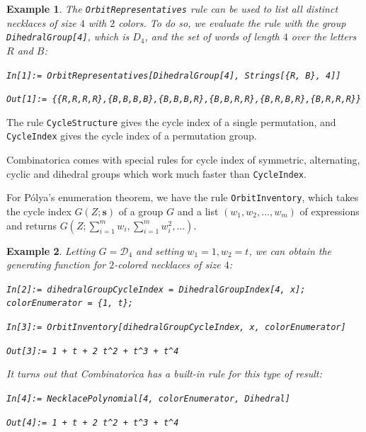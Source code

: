 \documentclass[12pt]{article}
\theoremstyle{plain}
\newtheorem{exa}{Example}
\newcommand{\codefont}[1]{{\fontshape{n}\texttt{#1}}}
\newenvironment{snippet}{\vspace{10px}\fontfamily{ppl}\selectfont}{\vspace{10px}}
\begin{document}
\begin{exa}
The \codefont{OrbitRepresentatives} rule can be used to
list all distinct necklaces of size \( 4 \) with \( 2 \) colors.
To do so, we evaluate the rule with the group \codefont{DihedralGroup[4]}, which is \(D_4\), and the set of words of length \( 4 \) over the letters \(R\) and \(B\):

\begin{snippet}
\codefont{In[1]:= OrbitRepresentatives[DihedralGroup[4], Strings[\{R, B\}, 4]] }

\codefont{Out[1]:= \{\{R,R,R,R\},\{B,B,B,B\},\{B,B,B,R\},\{B,B,R,R\},\{B,R,B,R\},\{B,R,R,R\}\} }
\end{snippet}
\end{exa}

The rule \codefont{CycleStructure} gives the cycle index of a single permutation, and \codefont{CycleIndex} gives the cycle index of a permutation group.

Combinatorica comes with special rules for cycle index of symmetric, alternating, cyclic and dihedral groups which work much faster than \codefont{CycleIndex}.

For P\'olya's enumeration theorem, we have the rule \codefont{OrbitInventory}, which takes the cycle index \( G( Z; \boldsymbol{s} ) \) of a group \(G\) and a list \( (w_1, w_2, \dots, w_m ) \)
of expressions and returns \( G(Z; \sum_{i=1}^m w_i, \sum_{i=1}^m w_i^2, \dots ) \).

\begin{exa}
Letting \( G = \mathcal{D}_4 \) and setting \( w_1 = 1, w_2 = t \), we can obtain the generating function for \( 2 \)-colored necklaces of size \( 4 \):

\begin{snippet}
\codefont{In[2]:= dihedralGroupCycleIndex =  DihedralGroupIndex[4, x];}\\
\codefont{colorEnumerator = \{1, t\}; }

\codefont{In[3]:= OrbitInventory[dihedralGroupCycleIndex, x, colorEnumerator] }

\codefont{Out[3]:= 1 + t + 2 t\^{}2 + t\^{}3 + t\^{}4 }
\end{snippet}

It turns out that Combinatorica has a built-in rule for this type of result:

\begin{snippet}
\codefont{In[4]:= NecklacePolynomial[4, colorEnumerator, Dihedral]}

\codefont{Out[4]:= 1 + t + 2 t\^{}2 + t\^{}3 + t\^{}4 }
\end{snippet}
\end{exa}
\end{document}
